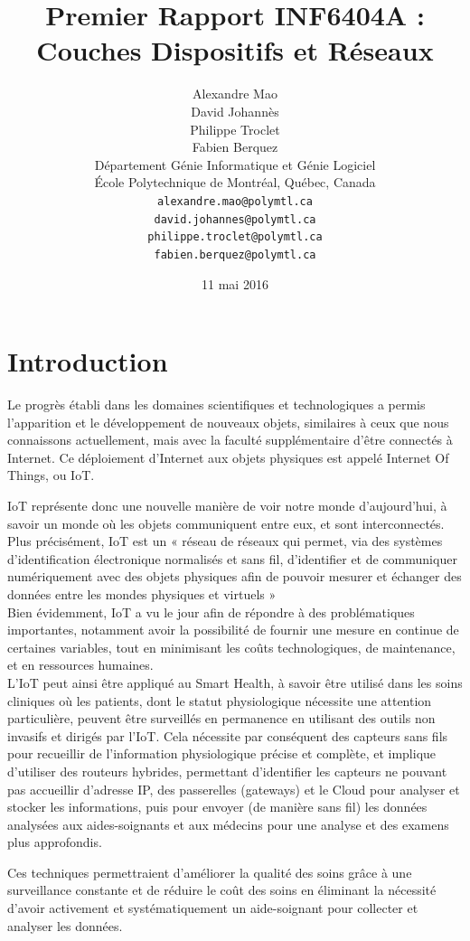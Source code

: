\documentclass{article}
\title{Premier Rapport INF6404A : Couches Dispositifs et Réseaux}
\author{
	Alexandre Mao\\
	David Johannès \\
	Philippe Troclet \\
	Fabien Berquez \\
	D\'{e}partement G\'{e}nie Informatique et G\'{e}nie Logiciel \\
	\'{E}cole Polytechnique de Montr\'{e}al, Qu\'{e}bec, Canada \\
	\texttt{alexandre.mao@polymtl.ca}\\
	\texttt{david.johannes@polymtl.ca}\\
	\texttt{philippe.troclet@polymtl.ca}   \\
	\texttt{fabien.berquez@polymtl.ca}   \\
}
\date{11 mai 2016}
\begin{document}
\maketitle

\section{Introduction}

Le progrès établi dans les domaines scientifiques et technologiques a permis l’apparition et le développement de nouveaux objets, similaires à ceux que nous connaissons actuellement, mais avec la faculté supplémentaire d’être connectés à Internet. Ce déploiement d’Internet aux objets physiques est appelé Internet Of Things, ou IoT.

IoT représente donc une nouvelle manière de voir notre monde d’aujourd'hui, à savoir un monde où les objets communiquent entre eux, et sont interconnectés. Plus précisément, IoT est un « réseau de réseaux qui permet, via des systèmes d’identification électronique normalisés et sans fil, d’identifier et de communiquer numériquement avec des objets physiques afin de pouvoir mesurer et échanger des données entre les mondes physiques et virtuels » \cite{benghozi2009internet}
\\

Bien évidemment, IoT a vu le jour afin de répondre à des problématiques importantes, notamment avoir la possibilité de fournir une mesure en continue de certaines variables, tout en minimisant les coûts technologiques, de maintenance, et en ressources humaines.
\\

L’IoT peut ainsi être appliqué au Smart Health, à savoir être utilisé dans les soins cliniques où les patients, dont le statut physiologique nécessite une attention particulière, peuvent être surveillés en permanence en utilisant des outils non invasifs et dirigés par l’IoT. Cela nécessite par conséquent des capteurs sans fils pour recueillir de l'information physiologique précise et complète, et implique d’utiliser des routeurs hybrides, permettant d'identifier les capteurs ne pouvant pas accueillir d'adresse IP, des passerelles (gateways) et le Cloud pour analyser et stocker les informations, puis pour envoyer (de manière sans fil) les données analysées aux aides-soignants et aux médecins pour une analyse et des examens plus approfondis.

Ces techniques permettraient d’améliorer la qualité des soins grâce à une surveillance constante et de réduire le coût des soins en éliminant la nécessité d’avoir activement et systématiquement un aide-soignant pour collecter et analyser les données.
\end{document}
